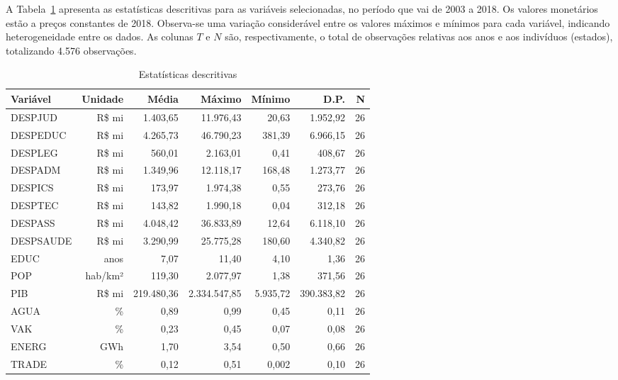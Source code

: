 \documentclass[
  12pt,
  a4paper,
  oneside,
  brazil,
  chapter=TITLE,
  section=TITLE
]{abntex2}
\begin{document}
A Tabela~\ref{tab:descritiva} apresenta as estatísticas descritivas para as variáveis selecionadas, no período que vai de 2003 a 2018. Os valores monetários estão a preços constantes de 2018. Observa-se uma variação considerável entre os valores máximos e mínimos para cada variável, indicando heterogeneidade entre os dados. As colunas $T$ e $N$ são, respectivamente, o total de observações relativas aos anos e aos indivíduos (estados), totalizando 4.576 observações.

\begin{table}[H]
  \centering
  \caption{Estatísticas descritivas}
  \label{tab:descritiva}
  \footnotesize
  \begin{tabular}{lrrrrrr}
    \toprule
    \textbf{Variável} & \textbf{Unidade} & \textbf{Média} & \textbf{Máximo} & \textbf{Mínimo} & \textbf{D.P.} & \textbf{N} \\
    \midrule
    DESPJUD   & R\$ mi   & 1.403,65   & 11.976,43   & 20,63   & 1.952,92  & 26 \\
    DESPEDUC  & R\$ mi   & 4.265,73   & 46.790,23   & 381,39  & 6.966,15  & 26 \\
    DESPLEG   & R\$ mi   & 560,01     & 2.163,01    & 0,41    & 408,67    & 26 \\
    DESPADM   & R\$ mi   & 1.349,96   & 12.118,17   & 168,48  & 1.273,77  & 26 \\
    DESPICS   & R\$ mi   & 173,97     & 1.974,38    & 0,55    & 273,76    & 26 \\
    DESPTEC   & R\$ mi   & 143,82     & 1.990,18    & 0,04    & 312,18    & 26 \\
    DESPASS   & R\$ mi   & 4.048,42   & 36.833,89   & 12,64   & 6.118,10  & 26 \\
    DESPSAUDE & R\$ mi   & 3.290,99   & 25.775,28   & 180,60  & 4.340,82  & 26 \\
    EDUC      & anos     & 7,07       & 11,40       & 4,10    & 1,36      & 26 \\
    POP       & hab/km²  & 119,30     & 2.077,97    & 1,38    & 371,56    & 26 \\
    PIB       & R\$ mi   & 219.480,36 & 2.334.547,85& 5.935,72& 390.383,82& 26 \\
    AGUA      & \%       & 0,89       & 0,99        & 0,45    & 0,11      & 26 \\
    VAK       & \%       & 0,23       & 0,45        & 0,07    & 0,08      & 26 \\
    ENERG     & GWh      & 1,70       & 3,54        & 0,50    & 0,66      & 26 \\
    TRADE     & \%       & 0,12       & 0,51        & 0,002   & 0,10      & 26 \\
    \bottomrule
  \end{tabular}
\end{table}
\end{document}

